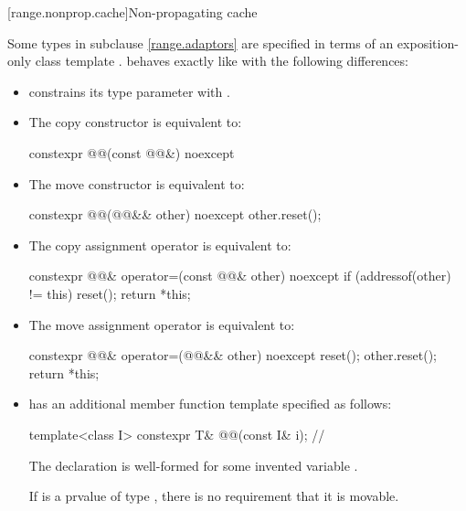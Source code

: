 [range.nonprop.cache]{Non-propagating cache}

\pnum
Some types in subclause \ref{range.adaptors} are specified in terms of
an exposition-only class template .
 behaves exactly like 
with the following differences:
\begin{itemize}
\item
{} constrains its type parameter 
with .
\item
The copy constructor is equivalent to:
\begin{codeblock}
constexpr @@(const @@&) noexcept {}
\end{codeblock}
\item
The move constructor is equivalent to:
\begin{codeblock}
constexpr @@(@@&& other) noexcept {
  other.reset();
}
\end{codeblock}
\item
The copy assignment operator is equivalent to:
\begin{codeblock}
constexpr @@& operator=(const @@& other) noexcept {
  if (addressof(other) != this)
    reset();
  return *this;
}
\end{codeblock}
\item
The move assignment operator is equivalent to:
\begin{codeblock}
constexpr @@& operator=(@@&& other) noexcept {
  reset();
  other.reset();
  return *this;
}
\end{codeblock}
\item
{} has an additional member function template
specified as follows:
\begin{itemdecl}
template<class I>
  constexpr T& @@(const I& i);    // \expos
\end{itemdecl}

\begin{itemdescr}
 \mandates
The declaration  is well-formed
for some invented variable .
\begin{note}
If  is a prvalue of type \cv{} ,
there is no requirement that it is movable.
\end{note}


\end{itemdescr}
\end{itemize}
